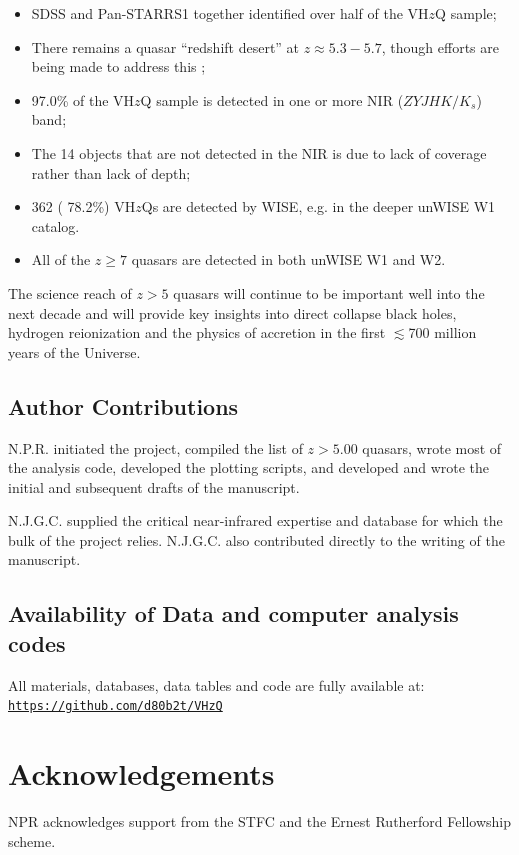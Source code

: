\documentclass[usenatbib]{mnras}
\begin{document}
\begin{itemize}
    \item SDSS and Pan-STARRS1 together identified over half of the VH$z$Q sample;  
    \item There remains a quasar ``redshift desert'' at $z\approx5.3-5.7$, though 
      efforts are being made to address this \citep[e.g.,][]{YangJ2018a};
    \item 97.0\% of the VH$z$Q sample is detected in one or more NIR ($ZYJHK/K_{s}$) band; 
    \item The 14 objects that are not detected in the NIR is due to lack of coverage rather than lack of depth; 
   \item 362 ( 78.2\%) VH$z$Qs are detected by WISE, e.g. in the deeper unWISE W1 catalog. 
 \item All of the $z\geq7$ quasars are detected in both unWISE W1 and W2. 
\end{itemize}

The science reach of $z>5$ quasars will continue to be important well
into the next decade \citep{Becker2019_DecadalWP, Fan2019_DecadalWP,
Wang2019_DecadalWP} and will provide key insights into direct collapse
black holes, hydrogen reionization and the physics of accretion in the
first $\lesssim$700 million years of the Universe.



\subsection*{Author Contributions}   
N.P.R. initiated the project, compiled the list of $z>5.00$ quasars, wrote most of the analysis code, developed the plotting scripts, and developed and wrote the initial and subsequent drafts of the manuscript.

N.J.G.C. supplied the critical near-infrared expertise and database for which the bulk of the project relies. N.J.G.C. also contributed directly to the writing of the manuscript.



\subsection*{Availability of Data and computer analysis codes} 
All materials, databases, data tables and code are fully available at: 
\href{https://github.com/d80b2t/VHzQ}{\tt https://github.com/d80b2t/VHzQ}


\section*{Acknowledgements}
NPR acknowledges support from the STFC and the Ernest Rutherford Fellowship scheme. 
\end{document}
